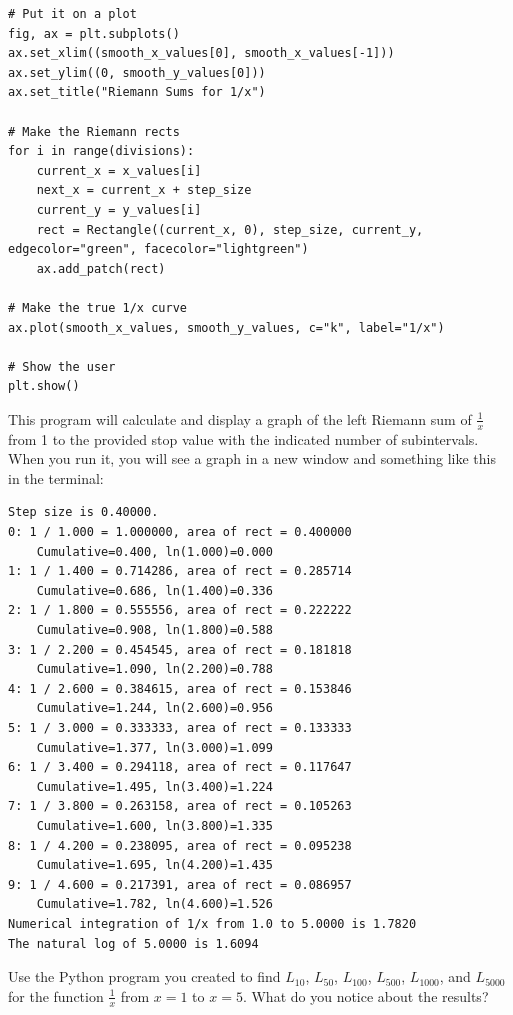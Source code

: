 \begin{verbatim}
# Put it on a plot
fig, ax = plt.subplots()
ax.set_xlim((smooth_x_values[0], smooth_x_values[-1]))
ax.set_ylim((0, smooth_y_values[0]))
ax.set_title("Riemann Sums for 1/x")

# Make the Riemann rects
for i in range(divisions):
    current_x = x_values[i]
    next_x = current_x + step_size
    current_y = y_values[i]
    rect = Rectangle((current_x, 0), step_size, current_y, edgecolor="green", facecolor="lightgreen")
    ax.add_patch(rect)

# Make the true 1/x curve
ax.plot(smooth_x_values, smooth_y_values, c="k", label="1/x")

# Show the user
plt.show()

\end{verbatim}

This program will calculate and display a graph of the left Riemann sum of $\frac{1}{x}$ from 1 to the provided stop value with the indicated number of subintervals. When you run it, you will see a graph in a new window and something like this in the terminal:
\begin{verbatim}
Step size is 0.40000.
0: 1 / 1.000 = 1.000000, area of rect = 0.400000 
	Cumulative=0.400, ln(1.000)=0.000
1: 1 / 1.400 = 0.714286, area of rect = 0.285714 
	Cumulative=0.686, ln(1.400)=0.336
2: 1 / 1.800 = 0.555556, area of rect = 0.222222 
	Cumulative=0.908, ln(1.800)=0.588
3: 1 / 2.200 = 0.454545, area of rect = 0.181818 
	Cumulative=1.090, ln(2.200)=0.788
4: 1 / 2.600 = 0.384615, area of rect = 0.153846 
	Cumulative=1.244, ln(2.600)=0.956
5: 1 / 3.000 = 0.333333, area of rect = 0.133333 
	Cumulative=1.377, ln(3.000)=1.099
6: 1 / 3.400 = 0.294118, area of rect = 0.117647 
	Cumulative=1.495, ln(3.400)=1.224
7: 1 / 3.800 = 0.263158, area of rect = 0.105263 
	Cumulative=1.600, ln(3.800)=1.335
8: 1 / 4.200 = 0.238095, area of rect = 0.095238 
	Cumulative=1.695, ln(4.200)=1.435
9: 1 / 4.600 = 0.217391, area of rect = 0.086957 
	Cumulative=1.782, ln(4.600)=1.526
Numerical integration of 1/x from 1.0 to 5.0000 is 1.7820
The natural log of 5.0000 is 1.6094
\end{verbatim}

\begin{Exercise}[label=rsumpython]
	Use the Python program you created to find $L_{10}$, $L_{50}$, $L_{100}$, $L_{500}$, $L_{1000}$, and $L_{5000}$ for the function $\frac{1}{x}$ from $x=1$ to $x=5$. What do you notice about the results?
\end{Exercise}

